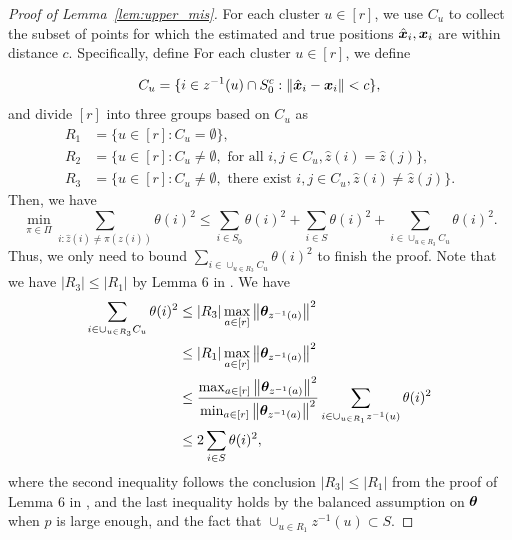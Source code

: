 \documentclass[lettersize,onecolumn,journal]{IEEEtran}
\theoremstyle{definition}
\theoremstyle{definition}
\begin{document}
\begin{proof}[Proof of Lemma~\ref{lem:upper_mis}] 

For each cluster $u\in[r]$, we use $C_u$ to collect the subset of points for which the estimated and true positions $\hat {\bm x}_i, \bm x_i$ are within distance $c$. Specifically, define
For each cluster $u \in [r]$, we define 

\begin{equation}
    C_u = \{ i \in z^{-1}(u) \cap S_0^c: \left\lVert\hat {\bm x}_i - \bm x_i\right\rVert < c \},
\end{equation}
and divide $[r]$ into three groups based on $C_u$ as 
\begin{align}
    R_1 &= \{ u \in [r]: C_u = \emptyset \},\\
    R_2 &= \{ u \in [r]: C_u \neq \emptyset, \text{ for all } i, j \in C_u, \hat z(i) = \hat z(j) \},\\
    R_3 &= \{ u \in [r]: C_u \neq \emptyset, \text{ there exist } i, j \in C_u, \hat z(i) \neq \hat z(j) \}.
\end{align}
Then, we have 
\begin{equation}
    \min_{\pi \in \Pi} \sum_{i : \hat z(i) \neq \pi(z(i))} \theta(i)^2 \leq \sum_{i \in S_0} \theta(i)^2 + \sum_{i \in S} \theta(i)^2 + \sum_{ i \in \cup_{u \in R_3} C_u} \theta(i)^2.
\end{equation}
Thus, we only need to bound $\sum_{ i \in \cup_{u \in R_3} C_u} \theta(i)^2$ to finish the proof. Note that we have $|R_3| \leq |R_1|$ by Lemma 6 in \citep{gao2018community}. We have 
\begin{align}
    \sum_{ i \in \cup_{u \in R_3} C_u} \theta(i)^2 &\leq |R_3| \max_{a \in [r]} \left\lVert\boldsymbol{\theta}_{z^{-1}(a)}\right\rVert^2 \\
    & \leq |R_1| \max_{a \in [r]} \left\lVert\boldsymbol{\theta}_{z^{-1}(a)}\right\rVert^2  \\
    & \leq {\max_{a \in [r]} \left\lVert\boldsymbol{\theta}_{z^{-1}(a)}\right\rVert^2 \over \min_{a \in [r]} \left\lVert\boldsymbol{\theta}_{z^{-1}(a)}\right\rVert^2 } \sum_{i \in \cup_{u \in R_1} z^{-1}(u)} \theta(i)^2\\
    & \leq 2 \sum_{i \in S} \theta(i)^2,
\end{align}
where the second inequality follows the conclusion $|R_3| \leq |R_1|$ from the proof of Lemma 6 in \citep{gao2018community}, and the last inequality holds by the balanced assumption on $\boldsymbol{\theta}$ when $p$ is large enough, and the fact that $ \cup_{u \in R_1} z^{-1}(u) \subset S$.

\end{proof}
\end{document}
